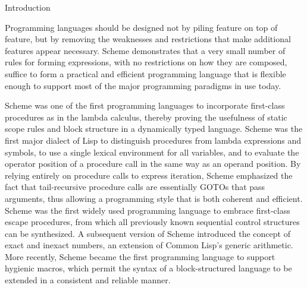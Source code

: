 Introduction

\label{historysection}

Programming languages should be designed not by piling feature on top of
feature, but by removing the weaknesses and restrictions that make additional
features appear necessary.  Scheme demonstrates that a very small number
of rules for forming expressions, with no restrictions on how they are
composed, suffice to form a practical and efficient programming language
that is flexible enough to support most of the major programming
paradigms in use today.

Scheme
was one of the first programming languages to incorporate first-class
procedures as in the lambda calculus, thereby proving the usefulness of
static scope rules and block structure in a dynamically typed language.
Scheme was the first major dialect of Lisp to distinguish procedures
from lambda expressions and symbols, to use a single lexical
environment for all variables, and to evaluate the operator position
of a procedure call in the same way as an operand position.  By relying
entirely on procedure calls to express iteration, Scheme emphasized the
fact that tail-recursive procedure calls are essentially GOTOs that
pass arguments, thus allowing a programming style that is both coherent
and efficient.  Scheme was the first widely used programming language to
embrace first-class escape procedures, from which all previously known
sequential control structures can be synthesized.  A subsequent
version of Scheme introduced the concept of exact and inexact numbers,
an extension of Common Lisp's generic arithmetic.
More recently, Scheme became the first programming language to support
hygienic macros, which permit the syntax of a block-structured language
to be extended in a consistent and reliable manner.

